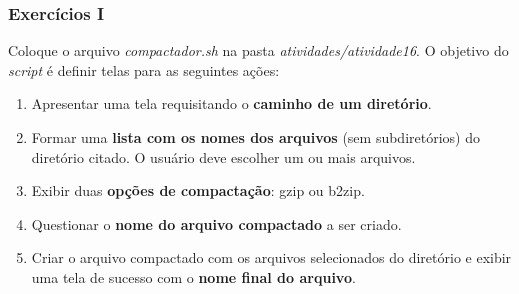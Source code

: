 \documentclass{beamer}
\begin{document}
   \begin{frame}
      \frametitle{Exercícios I}
      Coloque o arquivo \textit{compactador.sh} na pasta \textit{atividades/atividade16}. O objetivo do \textit{script} é definir telas para as seguintes ações:
      \begin{enumerate}
         \item Apresentar uma tela requisitando o \textbf{caminho de um diretório}.
	 \item Formar uma \textbf{lista com os nomes dos arquivos} (sem subdiretórios) do diretório citado. O usuário deve escolher um ou mais arquivos.
	 \item Exibir duas \textbf{opções de compactação}: gzip ou b2zip.
	 \item Questionar o \textbf{nome do arquivo compactado} a ser criado.
	 \item Criar o arquivo compactado com os arquivos selecionados do diretório e exibir uma tela de sucesso com o \textbf{nome final do arquivo}.
      \end{enumerate}
   \end{frame}
\end{document}
